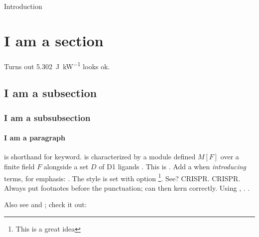 
\begin{MainChapter}{Introduction}


\section{I am a section}

Turns out \qty{5.302}{\joule\per\kilo\watt} looks ok.

\subsection{I am a subsection}

\subsubsection{I am a subsubsection}

\paragraph*{I am a paragraph}  %
 is shorthand for keyword.
 is characterized by a module defined $M[F]$ over a finite field $F$ alongside a set $D$ of \ac{D1} ligands \cite{yolov6}.
This is .
Add a \code{*} when \emph{introducing} terms, for emphasis: .
The style is set with  option \footnote{This is a great idea}. See? \ac{CRISPR}. \ac{CRISPR}. Always put footnotes before the punctuation;  can then kern correctly.
Using , . .

Also see  and ; check it out:





\end{MainChapter}
